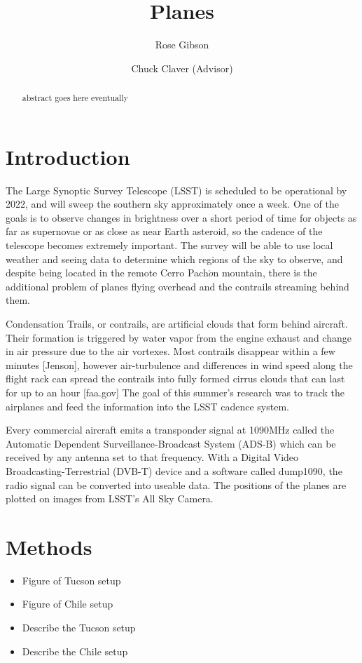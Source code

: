 \documentclass[notitlepage, twocolumn]{revtex4}
\begin{document}
\title{Planes}
\author{Rose Gibson}
\author{Chuck Claver (Advisor)}

\begin{abstract}
abstract goes here eventually
\end{abstract}
\maketitle        

\section{Introduction}

The Large Synoptic Survey Telescope (LSST) is scheduled to be operational by 2022, and will sweep the southern sky approximately once a week. One of the goals is to observe changes in brightness over a short period of time for objects as far as supernovae or as close as near Earth asteroid, so the cadence of the telescope becomes extremely important. The survey will be able to use local weather and seeing data to determine which regions of the sky to observe, and despite being located in the remote Cerro Pach$\acute{o}$n mountain, there is the additional problem of planes flying overhead and the contrails streaming behind them.

Condensation Trails, or contrails, are artificial clouds that form behind aircraft. Their formation is triggered by water vapor from the engine exhaust and change in air pressure due to the air vortexes. Most contrails disappear within a few minutes [Jenson], however air-turbulence and differences in wind speed along the flight rack can spread the contrails into fully formed cirrus clouds that can last for up to an hour [faa.gov] The goal of this summer's research was to track the airplanes and feed the information into the LSST cadence system.

Every commercial aircraft emits a transponder signal at 1090MHz called the Automatic Dependent Surveillance-Broadcast System (ADS-B) which can be received by any antenna set to that frequency. With a Digital Video Broadcasting-Terrestrial (DVB-T) device and a software called dump1090, the radio signal can be converted into useable data. The positions of the planes are plotted on images from LSST's All Sky Camera. 
\section{Methods}
\begin{itemize}
\item Figure of Tucson setup
\item Figure of Chile setup
\item Describe the Tucson setup
\item Describe the Chile setup
\end{itemize}
\end{document}
